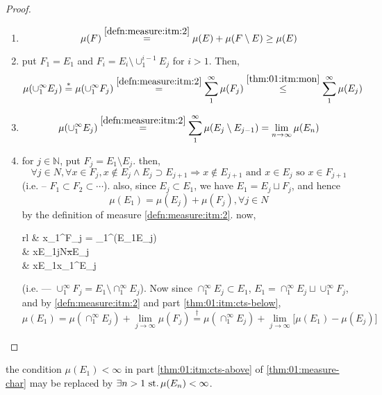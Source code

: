 \begin{proof}\
  \begin{enumerate}[label=(\alph*)]
  \item
    \[
    \mu(F)\stackrel{\ref{defn:measure:itm:2}}{=}
    \mu(E)+\mu(F\setminus E)\geq\mu(E)
    \]
  \item put ${F_1=E_1}$ and
    ${F_i=E_i\setminus \cup_1^{i-1} E_j}$ for ${i>1}$.  Then,
    \[
    \mu(\cup_1^\infty E_j)\stackrel{*}{=}
    \mu(\cup_1^\infty F_j)\stackrel{\ref{defn:measure:itm:2}}{=}
    \sum_1^\infty \mu(F_j)\stackrel{\ref{thm:01:itm:mon}}{\leq}
    \sum_1^\infty \mu(E_j)
    \]
  \item
    \[
    \mu(\cup_1^\infty E_j)\stackrel{\ref{defn:measure:itm:2}}{=}
    \sum_1^\infty \mu(E_j\setminus E_{j-1})=
    \lim_{n\rightarrow\infty} \mu(E_n)
    \]
  \item for ${j\in\mathbb{N}}$, put ${F_j=E_1\setminus E_j}$.  then,
    \[
    \forall j\in N,\forall x\in F_j,
    x\not\in E_j\land E_j\supset E_{j+1} \Rightarrow x\not\in E_{j+1}
    \text{ and }
    x\in E_j\text{ so } x\in F_{j+1}
    \]
    (i.e. -- ${F_1\subset F_2\subset\cdots}$).
    also, since ${E_j\subset E_1}$, we have
    ${E_1=E_j\sqcup F_j}$, and hence
    \begin{equation}
      \mu(E_1) = \mu(E_j)+\mu(F_j),\forall j\in N
      \tag{\dag}
    \end{equation}
    by the definition of measure \ref{defn:measure:itm:2}.  now,
    \begin{IEEEeqnarray*}{rl}
      & x\in\cup_1^\infty F_j = \cup_1^\infty (E_1\setminus E_j) \\
      \iff &
      x\in E_1\land\exists j\in N\st x\not\in E_j \\
      \iff &
      x\in E_1\land x\not\in\cap_1^\infty E_j
    \end{IEEEeqnarray*}
    (i.e. ---
    ${\cup_1^\infty F_j = E_1\setminus \cap_1^\infty E_j}$).
    Now since ${\cap_1^\infty E_j\subset E_1}$,
    ${E_1 = \cap_1^\infty E_j\sqcup \cup_1^\infty F_j}$,
    and by \ref{defn:measure:itm:2} and part
    \ref{thm:01:itm:cts-below},
    \[
    \mu(E_1)=\mu(\cap_1^\infty E_j)+\lim_{j\rightarrow\infty} \mu(F_j)
    \stackrel{\dag}{=} \mu(\cap_1^\infty E_j) + \lim_{j\rightarrow\infty} \big[
      \mu(E_1) - \mu(E_j)\big]
    \]
  \end{enumerate}
\end{proof}

\begin{rem}{}
  the condition ${\mu(E_1)<\infty}$ in part \ref{thm:01:itm:cts-above}
  of \ref{thm:01:measure-char} may be replaced by
  ${\exists n>1\operatorname{\,st.} \mu(E_n)<\infty}$.
\end{rem}

